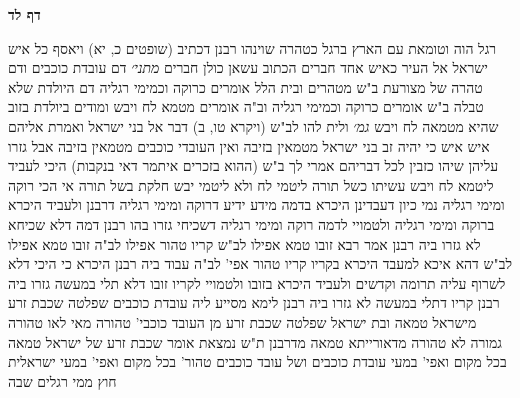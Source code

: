 \documentclass[12pt, openany]{book}
\newcommand{\sethebfont}{
\fontsize{10.5pt}{21.0pt} \selectfont
}
\newcommand{\twocol}[1]{
	{\sethebfont \begin{multicols}{2}
			#1
	\end{multicols}}	
}
\newcommand{\sectname}{}
\newcommand{\newsection}[1]{
	\addcontentsline{toc}{section}{#1}
	\renewcommand{\sectname}{#1}	
	\vspace{-\baselineskip}
	\begin{center}
		\textbf{%
\fontsize{16pt}{16pt}\selectfont
			#1}
	\end{center}
	\vspace{-\baselineskip}
	\nopagebreak
}
\begin{document}
\newsection{דף לד}
\twocol{רגל הוה וטומאת עם הארץ ברגל כטהרה שוינהו רבנן דכתיב (שופטים כ, יא) ויאסף כל איש ישראל אל העיר כאיש אחד חברים הכתוב עשאן כולן חברים
{\large\emph{מתני׳}} דם עובדת כוכבים ודם טהרה של מצורעת ב"ש מטהרים ובית הלל אומרים כרוקה וכמימי רגליה 
דם היולדת שלא טבלה ב"ש אומרים כרוקה וכמימי רגליה וב"ה אומרים מטמא לח ויבש 
ומודים ביולדת בזוב שהיא מטמאה לח ויבש
{\large\emph{גמ׳}} ולית להו לב"ש (ויקרא טו, ב) דבר אל בני ישראל ואמרת אליהם איש איש כי יהיה זב בני ישראל מטמאין בזיבה ואין העובדי כוכבים מטמאין בזיבה אבל גזרו עליהן שיהו כזבין לכל דבריהם
אמרי לך ב"ש (ההוא בזכרים איתמר דאי בנקבות) היכי לעביד ליטמא לח ויבש עשיתו כשל תורה ליטמי לח ולא ליטמי יבש חלקת בשל תורה 
אי הכי רוקה ומימי רגליה נמי כיון דעבדינן היכרא בדמה מידע ידיע דרוקה ומימי רגליה דרבנן 
ולעביד היכרא ברוקה ומימי רגליה ולטמויי לדמה רוקה ומימי רגליה דשכיחי גזרו בהו רבנן דמה דלא שכיחא לא גזרו ביה רבנן 
אמר רבא זובו טמא אפילו לב"ש קריו טהור אפילו לב"ה 
זובו טמא אפילו לב"ש דהא איכא למעבד היכרא בקריו
קריו טהור אפי' לב"ה עבוד ביה רבנן היכרא כי היכי דלא לשרוף עליה תרומה וקדשים 
ולעביד היכרא בזובו ולטמויי לקריו זובו דלא תלי במעשה גזרו ביה רבנן קריו דתלי במעשה לא גזרו ביה רבנן 
לימא מסייע ליה עובדת כוכבים שפלטה שכבת זרע מישראל טמאה ובת ישראל שפלטה שכבת זרע מן העובד כוכבי' טהורה מאי לאו טהורה גמורה לא טהורה מדאורייתא טמאה מדרבנן 
ת"ש נמצאת אומר שכבת זרע של ישראל טמאה בכל מקום
ואפי' במעי עובדת כוכבים ושל עובד כוכבים טהור' בכל מקום ואפי' במעי ישראלית חוץ ממי רגלים שבה 
}
\end{document}

